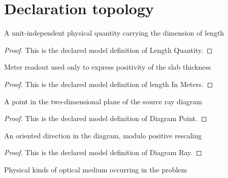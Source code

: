 \section{Declaration topology}
\begin{definition}
  \label{def:physics:phyx-mini-0138:phyxminiproblems-problemphyxmini0138-lengthquantity}
  A unit-independent physical quantity carrying the dimension of length
\end{definition}
\begin{proof}
  This is the declared model definition of Length Quantity.
\end{proof}
\begin{definition}
  \label{def:physics:phyx-mini-0138:phyxminiproblems-problemphyxmini0138-lengthinmeters}
  Meter readout used only to express positivity of the slab thickness
\end{definition}
\begin{proof}
  This is the declared model definition of length In Meters.
\end{proof}
\begin{definition}
  \label{def:physics:phyx-mini-0138:phyxminiproblems-problemphyxmini0138-diagrampoint}
  A point in the two-dimensional plane of the source ray diagram
\end{definition}
\begin{proof}
  This is the declared model definition of Diagram Point.
\end{proof}
\begin{definition}
  \label{def:physics:phyx-mini-0138:phyxminiproblems-problemphyxmini0138-diagramray}
  An oriented direction in the diagram, modulo positive rescaling
\end{definition}
\begin{proof}
  This is the declared model definition of Diagram Ray.
\end{proof}
\begin{definition}
  \label{def:physics:phyx-mini-0138:phyxminiproblems-problemphyxmini0138-mediumkind}
  Physical kinds of optical medium occurring in the problem
\end{definition}
